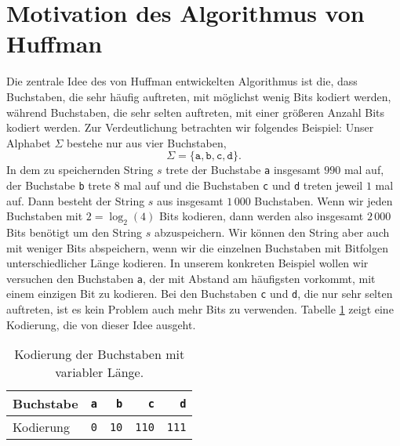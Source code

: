 \section{Motivation des Algorithmus von Huffman}
Die zentrale Idee des von Huffman entwickelten Algorithmus ist die, dass Buchstaben, die sehr
h\"aufig auftreten, mit m\"oglichst wenig Bits kodiert werden, w\"ahrend Buchstaben, die sehr selten
auftreten, mit einer gr\"o{\ss}eren Anzahl Bits kodiert werden.  Zur Verdeutlichung betrachten
wir folgendes Beispiel:  Unser Alphabet  $\Sigma$ bestehe nur aus vier Buchstaben,
\[ \Sigma = \{ \mathtt{a}, \mathtt{b}, \mathtt{c}, \texttt{d} \}. \]
In dem zu speichernden String $s$ trete der Buchstabe \texttt{a} insgesamt $990$ mal auf, der
Buchstabe \texttt{b} trete $8$ mal auf und die Buchstaben \texttt{c} und \texttt{d} treten
jeweil $1$ mal auf.  Dann besteht der String $s$ aus insgesamt $1\,000$ 
Buchstaben.  Wenn wir jeden Buchstaben mit $2 = \log_2(4)$ Bits kodieren, dann werden also
insgesamt $2\,000$ Bits ben\"otigt um den String $s$ abzuspeichern.  Wir k\"onnen den String
aber auch mit weniger Bits abspeichern, wenn wir die einzelnen Buchstaben mit Bitfolgen
unterschiedlicher L\"ange kodieren.   In unserem konkreten
Beispiel wollen wir versuchen den Buchstaben \texttt{a}, der mit Abstand am h\"aufigsten
vorkommt, mit einem einzigen Bit zu kodieren.  Bei den  Buchstaben
\texttt{c} und \texttt{d}, die nur sehr selten auftreten, ist es kein Problem auch mehr
Bits zu verwenden.  Tabelle \ref{tab:coding} zeigt eine Kodierung, die von dieser Idee
ausgeht. 

\begin{table}[htbp]
  \centering
\begin{tabular}[t]{|l|r|r|r|r|}
\hline
Buchstabe & \texttt{a} & \texttt{b}  & \texttt{c}   & \texttt{d}   \\
\hline
Kodierung & \texttt{0} & \texttt{10} & \texttt{110} & \texttt{111} \\
\hline
\end{tabular}
  \caption{Kodierung der Buchstaben mit variabler L\"ange.}
  \label{tab:coding}
\end{table}

